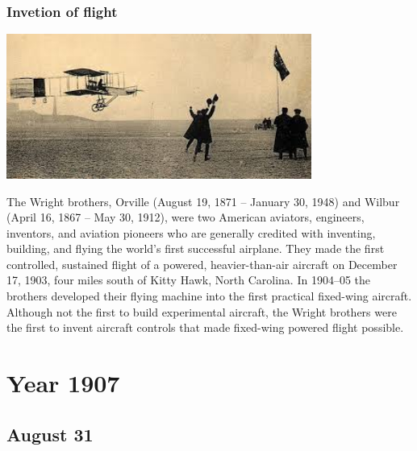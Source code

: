 \documentclass[11pt]{report}
\begin{document}
\subsection{Invetion of flight}
\vspace{2mm}\begin{center}\includegraphics[width=10cm]{./img/flight.jpg}\end{center}
The Wright brothers, Orville (August 19, 1871 – January 30, 1948) and Wilbur (April 16, 1867 – May 30, 1912), were two American aviators, engineers, inventors, and aviation pioneers who are generally credited with inventing, building, and flying the world's first successful airplane. They made the first controlled, sustained flight of a powered, heavier-than-air aircraft on December 17, 1903, four miles south of Kitty Hawk, North Carolina. In 1904–05 the brothers developed their flying machine into the first practical fixed-wing aircraft. Although not the first to build experimental aircraft, the Wright brothers were the first to invent aircraft controls that made fixed-wing powered flight possible.

\chapter{Year 1907}
\section{August 31}
\end{document}
